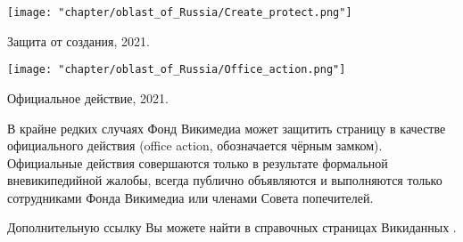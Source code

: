 \begin{marginfigure}[0.0cm]
{
	\setlength{\fboxsep}{0pt}%
	\setlength{\fboxrule}{1pt}%
	{\texttt{[image: "chapter/oblast\_of\_Russia/Create\_protect.png"]}}
}
\caption []{Защита от создания, 2021.}%
\label{fig:legend_population}%
\end{marginfigure}

\begin{marginfigure}[0.0cm]
{
	\setlength{\fboxsep}{0pt}%
	\setlength{\fboxrule}{1pt}%
	{\texttt{[image: "chapter/oblast\_of\_Russia/Office\_action.png"]}}
}
\caption []{Официальное действие, 2021.}%
\label{fig:legend_population}%
\end{marginfigure}

В крайне редких случаях Фонд Викимедиа может защитить страницу в качестве официального действия (office action, обозначается чёрным замком). Официальные действия совершаются только в результате формальной вневикипедийной жалобы, всегда публично объявляются и выполняются только сотрудниками Фонда Викимедиа или членами Совета попечителей.

Дополнительную ссылку Вы можете найти в справочных страницах Викиданных\protect\footnotemark
{}.